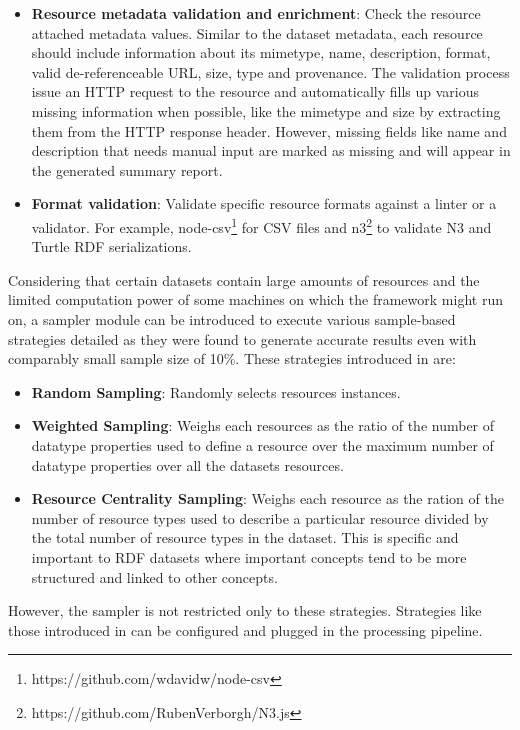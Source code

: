 \documentclass[runningheads,a4paper]{llncs}
\begin{document}
\begin{itemize}
  \item \textbf{Resource metadata validation and enrichment}: Check the resource attached metadata values. Similar to the dataset metadata, each resource should include information about its mimetype, name, description, format, valid de-referenceable URL, size, type and provenance. The validation process issue an HTTP request to the resource and automatically fills up various missing information when possible, like the mimetype and size by extracting them from the HTTP response header. However, missing fields like name and description that needs manual input are marked as missing and will appear in the generated summary report.
  \item \textbf{Format validation}: Validate specific resource formats against a linter or a validator. For example, node-csv\footnote{https://github.com/wdavidw/node-csv} for CSV files and n3\footnote{https://github.com/RubenVerborgh/N3.js} to validate N3 and Turtle RDF serializations.
\end{itemize}

Considering that certain datasets contain large amounts of resources and the limited computation power of some machines on which the framework might run on, a sampler module can be introduced to execute various sample-based strategies detailed as they were found to generate accurate results even with comparably small sample size of 10\%. These strategies introduced in \cite{scalableApproach} are:

\begin{itemize}
  \item \textbf{Random Sampling}: Randomly selects resources instances.
  \item \textbf{Weighted Sampling}: Weighs each resources as the ratio of the number of datatype properties used to define a resource over the maximum number of datatype properties over all the datasets resources.
  \item \textbf{Resource Centrality Sampling}: Weighs each resource as the ration of the number of resource types used to describe a particular resource divided by the total number of resource types in the dataset. This is specific and important to RDF datasets where important concepts tend to be more structured and linked to other concepts.
\end{itemize}

However, the sampler is not restricted only to these strategies. Strategies like those introduced in \cite{Leskovec:2006:SLG:1150402.1150479} can be configured and plugged in the processing pipeline.
\end{document}
